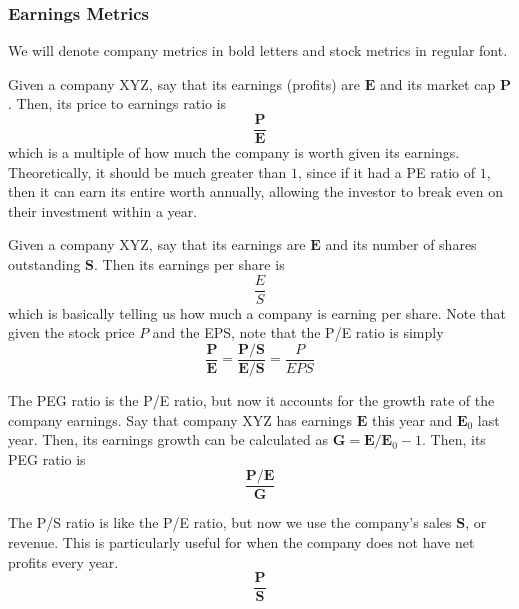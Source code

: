 \documentclass{article}
\begin{document}
\subsubsection{Earnings Metrics}

We will denote company metrics in bold letters and stock metrics in regular font. 

\begin{definition}[P/E Ratio]
Given a company XYZ, say that its earnings (profits) are $\mathbf{E}$ and its market cap $\mathbf{P}$. Then, its price to earnings ratio is 
\[\frac{\mathbf{P}}{\mathbf{E}}\]
which is a multiple of how much the company is worth given its earnings. Theoretically, it should be much greater than $1$, since if it had a PE ratio of $1$, then it can earn its entire worth annually, allowing the investor to break even on their investment within a year. 
\end{definition}

\begin{definition}
Given a company XYZ, say that its earnings are $\mathbf{E}$ and its number of shares outstanding $\mathbf{S}$. Then its earnings per share is 
\[\frac{E}{S}\]
which is basically telling us how much a company is earning per share. Note that given the stock price $P$ and the EPS, note that the P/E ratio is simply 
\[\frac{\mathbf{P}}{\mathbf{E}} = \frac{\mathbf{P} / \mathbf{S}}{\mathbf{E} / \mathbf{S}} = \frac{P}{EPS}\]
\end{definition}

\begin{definition}
The PEG ratio is the P/E ratio, but now it accounts for the growth rate of the company earnings. Say that company XYZ has earnings $\mathbf{E}$ this year and $\mathbf{E}_0$ last year. Then, its earnings growth can be calculated as $\mathbf{G} = \mathbf{E}/\mathbf{E}_0 - 1$. Then, its PEG ratio is 
\[\frac{\mathbf{P}/\mathbf{E}}{\mathbf{G}}\]
\end{definition}

\begin{definition}[P/S Ratio]
The P/S ratio is like the P/E ratio, but now we use the company's sales $\mathbf{S}$, or revenue. This is particularly useful for when the company does not have net profits every year. 
\[\frac{\mathbf{P}}{\mathbf{S}}\]
\end{definition}

\begin{definition}[ROIC]

\end{definition}
\end{document}
